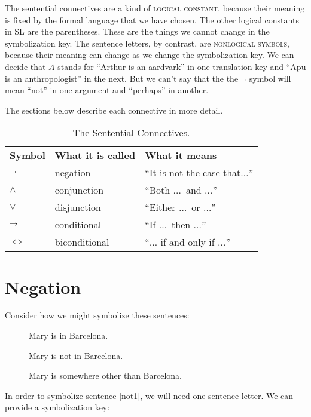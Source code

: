 The sentential connectives are a kind of \textsc{\gls{logical constant}},\label{def:logical_constant} because their meaning is fixed by the formal language that we have chosen. The other logical constants in SL are the parentheses. These are the things we cannot change in the symbolization key. The sentence letters, by contrast, are \textsc{\glspl{nonlogical symbol}}, \label{def:nonlogical_symbol} because their meaning can change as we change the symbolization key. We can decide that $A$ stands for ``Arthur is an aardvark'' in one translation key and ``Apu is an anthropologist'' in the next. But we can't say that the  the $\lnot$ symbol will mean ``not'' in one argument and ``perhaps'' in another.

The sections below describe each connective in more detail.

\begin{table}
\begin{tabu}{X[1,c] X[3,c] X[3,c]}
\textbf{Symbol} & \textbf{What it is called} & \textbf{What it means}\\
$\lnot$   & negation&      ``It is not the case that$\ldots$''\\
$\land$   & conjunction&   ``Both $\ldots$\ and $\ldots$''\\
$\lor$    & disjunction&   ``Either $\ldots$\ or $\ldots$''\\
$\mathrel{\rightarrow}$ & conditional&   ``If $\ldots$\ then $\ldots$''\\
$\iff$    & biconditional& ``$\ldots$ if and only if $\ldots$''\\
\end{tabu}
\caption{The Sentential Connectives.}
\label{table:sentential_connectives}
\end{table}

\section{Negation}
Consider how we might symbolize these sentences:

\begin{description}
\item[] Mary is in Barcelona.
\item[] Mary is not in Barcelona.
\item[] Mary is somewhere other than Barcelona.
\end{description}

In order to symbolize sentence \ref{not1}, we will need one sentence letter. We can provide a symbolization key:

